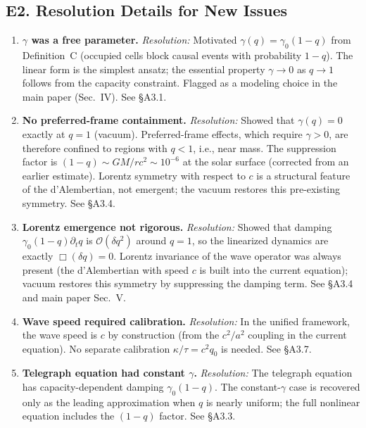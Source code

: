 \documentclass[reprint]{revtex4-2}
\begin{document}
\subsection{E2. Resolution Details for New Issues}

\begin{enumerate}[leftmargin=*]
\item[\textbf{F1:}] \textbf{$\gamma$ was a free parameter.} \textit{Resolution:} Motivated $\gamma(q)=\gamma_0(1-q)$ from Definition~C (occupied cells block causal events with probability $1-q$). The linear form is the simplest ansatz; the essential property $\gamma\to 0$ as $q\to 1$ follows from the capacity constraint. Flagged as a modeling choice in the main paper (Sec.~IV). See \S A3.1.

\item[\textbf{F2:}] \textbf{No preferred-frame containment.} \textit{Resolution:} Showed that $\gamma(q)=0$ exactly at $q=1$ (vacuum). Preferred-frame effects, which require $\gamma>0$, are therefore confined to regions with $q<1$, i.e., near mass. The suppression factor is $(1-q) \sim GM/rc^2 \sim 10^{-6}$ at the solar surface (corrected from an earlier estimate). Lorentz symmetry with respect to $c$ is a structural feature of the d'Alembertian, not emergent; the vacuum restores this pre-existing symmetry. See \S A3.4.

\item[\textbf{F3:}] \textbf{Lorentz emergence not rigorous.} \textit{Resolution:} Showed that damping $\gamma_0(1-q)\partial_t q$ is $\mathcal{O}(\delta q^2)$ around $q=1$, so the linearized dynamics are exactly $\Box(\delta q)=0$. Lorentz invariance of the wave operator was always present (the d'Alembertian with speed $c$ is built into the current equation); vacuum restores this symmetry by suppressing the damping term. See \S A3.4 and main paper Sec.~V.

\item[\textbf{F4:}] \textbf{Wave speed required calibration.} \textit{Resolution:} In the unified framework, the wave speed is $c$ by construction (from the $c^2/a^2$ coupling in the current equation). No separate calibration $\kappa/\tau = c^2 q_0$ is needed. See \S A3.7.

\item[\textbf{F5:}] \textbf{Telegraph equation had constant $\gamma$.} \textit{Resolution:} The telegraph equation has capacity-dependent damping $\gamma_0(1-q)$. The constant-$\gamma$ case is recovered only as the leading approximation when $q$ is nearly uniform; the full nonlinear equation includes the $(1-q)$ factor. See \S A3.3.


\end{enumerate}
\end{document}
